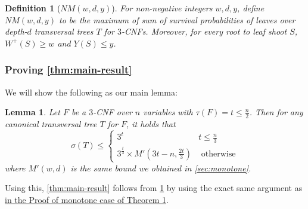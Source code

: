 \documentclass[10pt,a4paper]{article}
\newtheorem{lemma}{Lemma}
\newtheorem{fact}{Fact}
\newtheorem{definition}{Definition}
\newcommand{\trn}{\tau}
\newcommand{\total}{\sigma}
\newcommand{\openfunction}{Y}
\newcommand{\openinteger}{y}
\begin{document}
\begin{definition}[$NM(w, d, \openinteger)$]
For non-negative integers $w, d, \openinteger$, define $NM(w, d, \openinteger)$ to be the maximum of sum of survival probabilities of leaves over depth-$d$ transversal trees $T$ for $3$-CNFs. Moreover, for every root to leaf shoot $S$, $W^+(S) \ge w$ and $\openfunction(S) \le \openinteger$.
\end{definition}






\subsubsection{Proving \cref{thm:main-result}}

We will show the following as our main lemma:

\begin{lemma}
\label{pess-nonmonotone-ntran}
Let $F$ be a $3$-CNF over $n$ variables with $\trn(F) = t \le \frac{n}{2}$. Then for any canonical transversal tree $T$ for $F$, it holds that 
\[
\total(T) \le
\begin{cases}
3^t & t \le \frac{n}{3}\\
3^{\frac{t}{3}}\times M'\left(3t - n, \frac{2t}{3}\right) & \textrm{ otherwise}
\end{cases}
\]
where $M'(w, d)$ is the same bound we obtained in \cref{sec:monotone}.
\end{lemma}


Using this, \cref{thm:main-result} follows from \cref{pess-nonmonotone-ntran} by using the exact same argument as \hyperref[proof:monotone-main-result]{in the Proof of monotone case of Theorem 1}.
\end{document}
